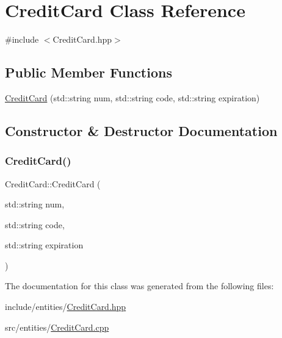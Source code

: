 \hypertarget{class_credit_card}{}\section{Credit\+Card Class Reference}
\label{class_credit_card}


{\ttfamily \#include $<$Credit\+Card.\+hpp$>$}

\subsection*{Public Member Functions}
\begin{DoxyCompactItemize}
\item 
\mbox{\hyperlink{class_credit_card_a5ac752fc539cfa8ac4f30a35a300e072}{Credit\+Card}} (std\+::string num, std\+::string code, std\+::string expiration)
\end{DoxyCompactItemize}


\subsection{Constructor \& Destructor Documentation}
\mbox{\label{class_credit_card_a5ac752fc539cfa8ac4f30a35a300e072}} 
\subsubsection{\texorpdfstring{CreditCard()}{CreditCard()}}
{\footnotesize\ttfamily Credit\+Card\+::\+Credit\+Card (\begin{DoxyParamCaption}\item[{std\+::string}]{num,  }\item[{std\+::string}]{code,  }\item[{std\+::string}]{expiration }\end{DoxyParamCaption})}



The documentation for this class was generated from the following files\+:\begin{DoxyCompactItemize}
\item 
include/entities/\mbox{\hyperlink{_credit_card_8hpp}{Credit\+Card.\+hpp}}\item 
src/entities/\mbox{\hyperlink{_credit_card_8cpp}{Credit\+Card.\+cpp}}\end{DoxyCompactItemize}
